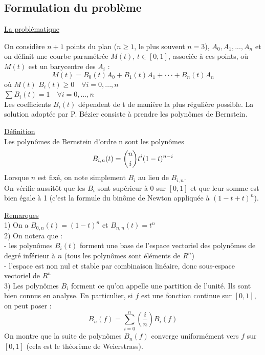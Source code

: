 \documentclass{article}
\begin{document}
\newpage
\subsection{Formulation du probl\`{e}me}
\begingroup\raggedleft
\underline{La probl\'{e}matique}
\endgroup
\par
On consid\`{e}re $n+1$ points du plan ($n \ge 1$, le plus souvent $n = 3$), $A_0 , A_1 , . . ., A_n$ et on d\'{e}finit une courbe param\'{e}tr\'{e}e $M(t)$, $t \in [0, 1]$, associ\'{e}e \`{a} ces points, o\`{u} $M(t)$ est un barycentre des $A_i$ :
\[M(t) = B_0 (t)A_0 + B_1 (t)A_1 + · · · + B_n (t)A_n\]
o\`{u} $M(t)$ $B_i(t) \ge 0 \quad \forall i = 0, ..., n$
\\[2pt]
$\sum B_i (t) = 1 \quad \forall i = 0, ..., n$
\\[10pt]
Les coefficients $B_i(t)$ d\'{e}pendent de t de mani\`{e}re la plus r\'{e}guli\`{e}re possible.
La solution adopt\'{e}e par P. B\'{e}zier consiste \`{a} prendre les polyn\^{o}mes de Bernstein.

\begingroup\raggedleft
\underline{D\'{e}finition}
\endgroup
\\
Les polyn\^{o}mes de Bernstein d'ordre n sont les polyn\^{o}mes \[B_{i, n} (t) = \dbinom{n}{i}t^i(1-t)^{n-i}\]
Lorsque $n$ est fix\'{e}, on note simplement $B_i$ au lieu de $B_{i, n}$. 
\\
On v\'{e}rifie aussit\^{o}t que les $B_i$ sont sup\'{e}rieur \`{a} 0 sur $[0, 1]$ et que leur somme est bien égale \`{a} 1 (c'est la formule du bin\^{o}me de Newton appliqu\'{e}e \`{a} $(1 -t + t)^n$).

\begingroup\raggedleft
\underline{Remarques}
\endgroup
\\[5pt]
1) On a $B_{0, n} (t) = (1-t)^n$ et $B_{n, n} (t) = t^n$
\\
2) On notera que :
\\
- les polyn\^{o}mes $B_i (t)$ forment une base de l'espace vectoriel des polyn\^{o}mes de degr\'{e} inf\'{e}rieur \`{a} $n$ (tous les polyn\^{o}mes sont \'{e}l\'{e}ments de $R^n$)
\\
- l'espace est non nul et stable par combinaison lin\'{e}aire, donc sous-espace vectoriel de $R^n$
\\
3) Les polyn\^{o}mes $B_i$ forment ce qu'on appelle une partition de l'unit\'{e}. Ils sont bien connus en analyse. En particulier, si $f$ est une fonction continue sur $[0, 1]$, on peut poser :
\[B_n (f) = \sum \limits_{\underset{}{i=0}}^n (\frac{i}{n})B_i(f)\]
On montre que la suite de polyn\^{o}mes $B_n (f)$ converge uniform\'{e}ment vers $f$ sur $[0, 1]$ (cela est le th\'{e}or\`{e}me de Weierstrass).
\end{document}
